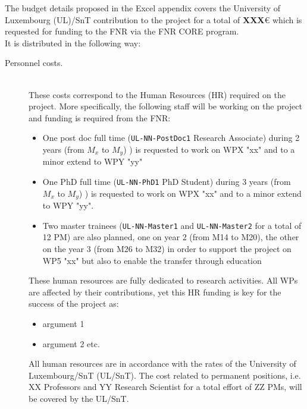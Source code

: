 %

\noindent 
The budget details proposed in the Excel appendix covers the University of
Luxembourg (UL)/SnT contribution to the project for a total of
\textbf{XXX}\euro{} which is requested for funding to the FNR via the FNR CORE
program.
\\
It is distributed in the following way: 

\begin{description}
  \item[Personnel costs.]~\\
    These costs correspond to the Human Resources (HR) required on the
    project. More specifically, the following staff will be working on the
    project and funding is required from the FNR:
    \begin{itemize}
      \item One post doc full time (\texttt{UL-NN-PostDoc1} Research Associate)
        during 2 years (from $M_{x}$ to $M_{y}$) ) is requested to work on WPX "xx"
        and to a minor extend to WPY "yy"
      \item One PhD full time (\texttt{UL-NN-PhD1} PhD Student)
        during 3 years (from $M_{x}$ to $M_{y}$) ) is requested to work on WPX "xx"
        and to a minor extend to WPY "yy".
      \item Two master trainees (\texttt{UL-NN-Master1} and
        \texttt{UL-NN-Master2} for a total of 12 PM) are also planned, one on
        year 2 (from M14 to M20), the other on the year 3 (from M26 to M32) in
        order to support the project on WP5 "xx" but also to enable the transfer
        through education 
    \end{itemize}
    These human resources are fully dedicated to research activities. All WPs
    are affected by their contributions, yet this HR funding is key for the
    success of the project as:
    \begin{itemize}
      \item argument 1
      \item argument 2 etc.
    \end{itemize}
    All human resources are in accordance with the rates of the University of
    Luxembourg/SnT (UL/SnT). The cost related to permanent positions, i.e. XX
    Professors and YY Research Scientist for a total effort of ZZ PMs, will be
    covered by the UL/SnT.


\end{description}
